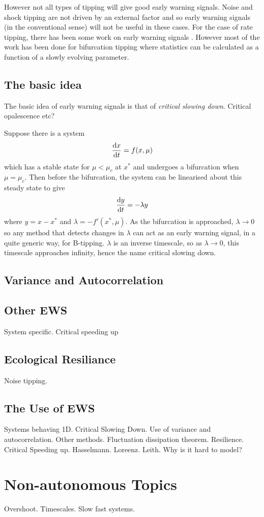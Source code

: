 However not all types of tipping will give good early warning signals. Noise and shock tipping are not driven by an external factor and so early warning signals (in the conventional sense)
will not be useful in these cases. For the case of rate tipping, there has been some work on early warning signals \parencite{Paul's paper, others?}. However most of the work has been done
for bifurcation tipping where statistics can be calculated as a function of a slowly evolving parameter.

\subsection{The basic idea}
The basic idea of early warning signals is that of \emph{critical slowing down}. Critical opalescence etc?

Suppose there is a system
\begin{equation}
  \label{eq:system}
  \dv{x}{t} = f(x,\mu)
\end{equation}
which has a stable state for $\mu < \mu_c$ at $x^*$ and undergoes a bifurcation when $\mu=\mu_c$. Then before the bifurcation, the system can be linearised about this steady state
to give
\begin{equation}
  \label{eq:linearised_about_steady_state}
  \dv{y}{t} = -\lambda y
\end{equation}
where $y = x -x^*$ and $\lambda = -f'(x^*,\mu)$. As the bifurcation is approached, $\lambda \rightarrow 0$ so any method that detects changes in $\lambda$ can act as an early warning
signal, in a quite generic way, for B-tipping. $\lambda$ is an inverse timescale, so as $\lambda \rightarrow 0$, this timescale approaches infinity, hence the name critical slowing down.



\subsection{Variance and Autocorrelation}
\subsection{Other EWS}
System specific. Critical speeding up
\subsection{Ecological Resiliance}
Noise tipping.
\subsection{The Use of EWS}


Systems behaving 1D. Critical Slowing Down. Use of variance and
autocorrelation. Other methods. Fluctuation dissipation theorem.
Resilience. Critical Speeding up. Hasselmann. Loreenz. Leith. 
Why is it hard to model?
\section{Non-autonomous Topics}
Overshoot. Timescales. Slow fast systems.